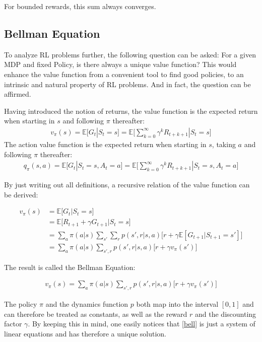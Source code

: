 \documentclass[paper=a4, fontsize=11pt]{scrartcl} %
\numberwithin{equation}{section} %
\numberwithin{figure}{section} %
\numberwithin{table}{section} %
\begin{document}
	For bounded rewards, this sum always converges.

\subsection{Bellman Equation}

	To analyze RL problems further, the following question can be asked: For a given MDP and fixed Policy, is there always a unique value function? This would enhance the value function from a convenient tool to find good policies, to an intrinsic and natural property of RL problems. And in fact, the question can be affirmed.

	Having introduced the notion of returns, the value function is the expected return when starting in $s$ and following $\pi$ thereafter:  
	 \begin{align}
	v_{\pi} (s) = \mathbb{E}\big[ G_t | S_t = s \big] = \mathbb{E}\big[ \sum_{k=0}^{\infty} \gamma^k R_{t+k+1} | S_t = s \big]
	\end{align}
The action value function is the expected return when starting in $s$, taking $a$ and following $\pi$ thereafter:  
	 \begin{align}	
	q_{\pi} (s,a) = \mathbb{E}\big[ G_t | S_t = s, A_t = a \big] = \mathbb{E}\big[ \sum_{k=0}^{\infty} \gamma^k R_{t+k+1} | S_t = s, A_t = a  \big] 
	\end{align}

	By just writing out all definitions, a recursive relation of the value function can be derived:

	\begin{align*}
	v_{\pi}(s) &= \mathbb{E} \big[ G_t | S_t = s \big] \\
	&= \mathbb{E} \big[ R_{t+1} + \gamma G_{t+1} | S_t = s \big]\\
	&= \sum_a \pi (a|s) \sum_{s'} \sum_{r} p(s',r|s,a) \big[ r + \gamma \mathbb{E} [ G_{t+1} | S_{t+1} = s' ] \big] \\
	&= \sum_a \pi(a|s) \sum_{s',r} p(s',r|s,a) \big[ r + \gamma v_{\pi}(s')  \big]
	\end{align*} 

	The result is called the Bellman Equation:

	\begin{align}
	v_{\pi}(s) = \sum_a \pi(a|s) \sum_{s',r} p(s',r|s,a) \big[ r + \gamma v_{\pi}(s')  \big] \label{bell} 
	\end{align}

	The policy $\pi$ and the dynamics function $p$ both map into the interval $[0,1]$ and can therefore be treated as constants, as well as the reward $r$ and the discounting factor $\gamma$. By keeping this in mind, one easily notices that \ref{bell} is just a system of linear equations and has therefore a unique solution. 
	
\end{document}
